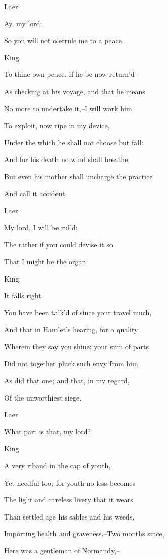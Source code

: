\documentclass[12pt]{book}
\begin{document}
Laer.

Ay, my lord;

So you will not o'errule me to a peace.



King.

To thine own peace. If he be now return'd--

As checking at his voyage, and that he means

No more to undertake it,--I will work him

To exploit, now ripe in my device,

Under the which he shall not choose but fall:

And for his death no wind shall breathe;

But even his mother shall uncharge the practice

And call it accident.



Laer.

My lord, I will be rul'd;

The rather if you could devise it so

That I might be the organ.



King.

It falls right.

You have been talk'd of since your travel much,

And that in Hamlet's hearing, for a quality

Wherein they say you shine: your sum of parts

Did not together pluck such envy from him

As did that one; and that, in my regard,

Of the unworthiest siege.



Laer.

What part is that, my lord?



King.

A very riband in the cap of youth,

Yet needful too; for youth no less becomes

The light and careless livery that it wears

Than settled age his sables and his weeds,

Importing health and graveness.--Two months since,

Here was a gentleman of Normandy,--
\end{document}
